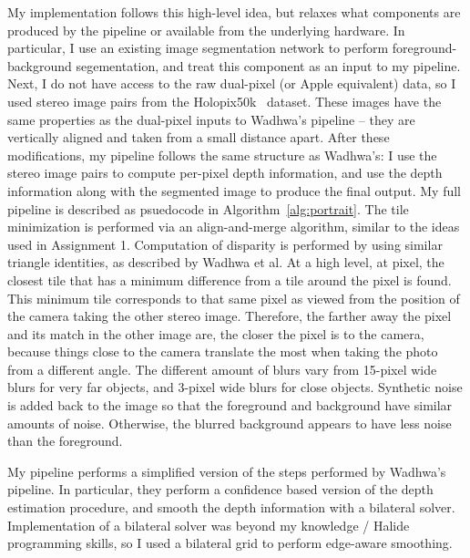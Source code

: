 \documentclass{article}
\begin{document}
My implementation follows this high-level idea, but relaxes what components are produced by the pipeline or available from the underlying hardware.
%
In particular, I use an existing image segmentation network to perform foreground-background segementation, and treat this component as an input
to my pipeline.
%
Next, I do not have access to the raw dual-pixel (or Apple equivalent) data, so I used stereo image pairs from the Holopix50k~\cite{holopix} dataset.
%
These images have the same properties as the dual-pixel inputs to Wadhwa's pipeline -- they are vertically aligned and taken from a small distance apart.
%
After these modifications, my pipeline follows the same structure as Wadhwa's: I use the stereo image pairs to compute per-pixel depth information, 
and use the depth information along with the segmented image to produce the final output.
%
My full pipeline is described as psuedocode in Algorithm~\ref{alg:portrait}.
%
The tile minimization is performed via an align-and-merge algorithm, similar to the ideas used in Assignment 1.
%
Computation of disparity is performed by using similar triangle identities, as described by Wadhwa et al.
%
At a high level, at pixel, the closest tile that has a minimum difference from a tile around the pixel is found.
%
This minimum tile corresponds to that same pixel as viewed from the position of the camera taking the other
stereo image.
%
Therefore, the farther away the pixel and its match in the other image are, the closer the pixel is to the camera,
because things close to the camera translate the most when taking the photo from a different angle.
%
The different amount of blurs vary from 15-pixel wide blurs for very far objects, and 3-pixel wide blurs for close objects.
%
Synthetic noise is added back to the image so that the foreground and background have similar amounts of noise.
%
Otherwise, the blurred background appears to have less noise than the foreground.

My pipeline performs a simplified version of the steps performed by Wadhwa's pipeline.
%
In particular, they perform a confidence based version of the depth estimation procedure, and smooth the depth information with
a bilateral solver. Implementation of a bilateral solver was beyond my knowledge / Halide programming skills, so I used a bilateral
grid to perform edge-aware smoothing.
\end{document}
